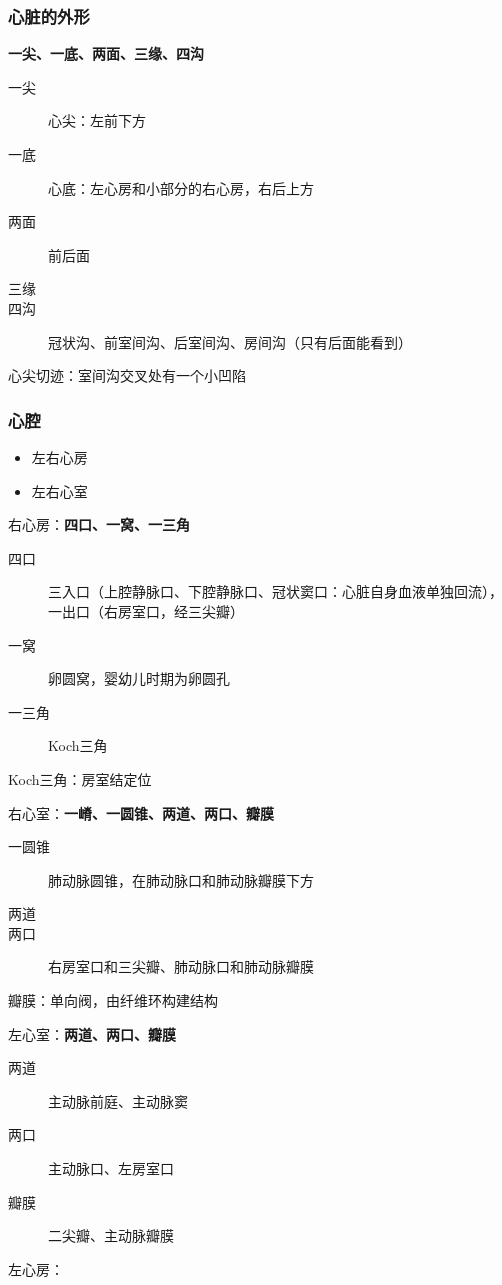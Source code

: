 \subsubsection*{心脏的外形}%
\label{subsub:心脏的外形}
\textbf{一尖、一底、两面、三缘、四沟}
\begin{description}
    \item[一尖] 心尖：左前下方
    \item [一底] 心底：左心房和小部分的右心房，右后上方
    \item [两面] 前后面
    \item [三缘] 
    \item [四沟] 冠状沟、前室间沟、后室间沟、房间沟（只有后面能看到）
\end{description}
\begin{notation}
心尖切迹：室间沟交叉处有一个小凹陷
\end{notation}
\subsubsection*{心腔}%
\label{subsub:心腔}
\begin{itemize}
    \item 左右心房
    \item 左右心室
\end{itemize}
右心房：\textbf{四口、一窝、一三角}
\begin{description}
    \item[四口] 三入口（上腔静脉口、下腔静脉口、冠状窦口：心脏自身血液单独回流），一出口（右房室口，经三尖瓣）
    \item [一窝] 卵圆窝，婴幼儿时期为卵圆孔
    \item [一三角] Koch三角
\end{description}
\begin{notation}
    Koch三角：房室结定位
\end{notation}
右心室：\textbf{一嵴、一圆锥、两道、两口、瓣膜}
\begin{description}
    \item[一圆锥] 肺动脉圆锥，在肺动脉口和肺动脉瓣膜下方
    \item [两道] 
    \item [两口] 右房室口和三尖瓣、肺动脉口和肺动脉瓣膜
\end{description}
\begin{notation}
瓣膜：单向阀，由纤维环构建结构
\end{notation}
左心室：\textbf{两道、两口、瓣膜}
\begin{description}
    \item[两道] 主动脉前庭、主动脉窦
    \item [两口] 主动脉口、左房室口
    \item [瓣膜] 二尖瓣、主动脉瓣膜
\end{description}
左心房：
